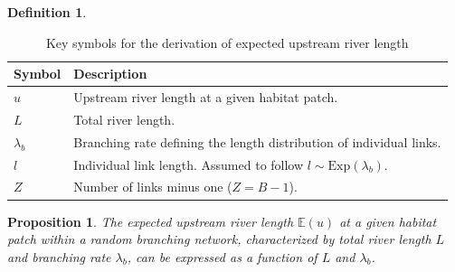 \documentclass[11pt, class=article, crop=false]{standalone}
\newtheorem{proposition}{Proposition}[subsection]
\theoremstyle{definition}
\newtheorem{definition}{Definition}[subsection]
\begin{document}
\begin{definition}
\vspace{0.5cm} 
\begin{table}
    \centering
    \caption{Key symbols for the derivation of expected upstream river length}
    \begin{tabularx}{\textwidth}{ll}
        \hline
        Symbol & Description\\
        \hline
        $u$ & Upstream river length at a given habitat patch.\\
        $L$ & Total river length.\\
        $\lambda_b$ & Branching rate defining the length distribution of individual links.\\
        $l$ & Individual link length. Assumed to follow $l \sim \mbox{Exp}(\lambda_b)$.\\
        $Z$ & Number of links minus one ($Z = B - 1$).\\
        \hline
    \end{tabularx}
    \label{tab:key-symbol}
\end{table}
\vspace{0.5cm} 

\end{definition}

\begin{proposition}
\label{proposition-u}
The expected upstream river length $\mathbb{E}(u)$ at a given habitat patch within a random branching network, characterized by total river length $L$ and branching rate $\lambda_b$, can be expressed as a function of $L$ and $\lambda_b$.
\end{proposition}
\end{document}
